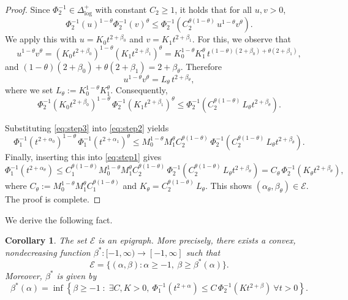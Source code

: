 \documentclass[12pt]{amsart}
\newtheorem{corollary}{Corollary}
\begin{document}
\begin{proof}
Since $\Phi_2^{-1}\in\Delta_{\log}^+$ with constant $C_2\ge 1$, it holds that for all $u,v>0$,
\[
\Phi_2^{-1}(u)^{1-\theta}\Phi_2^{-1}(v)^{\theta}
\le 
\Phi_2^{-1}\!\left(C_2^{\theta(1-\theta)}\,u^{1-\theta}v^{\theta}\right).
\]
We apply this with $u = K_0 t^{2+\beta_0}$ and $v = K_1 t^{2+\beta_1}$. For this, we observe that
\[
u^{1-\theta}v^{\theta}
= (K_0 t^{2+\beta_0})^{1-\theta} (K_1 t^{2+\beta_1})^{\theta}
= K_0^{1-\theta}K_1^{\theta} \,
t^{(1-\theta)(2+\beta_0)+\theta(2+\beta_1)},
\]
and $(1-\theta)(2+\beta_0)+\theta(2+\beta_1) = 2+\beta_\theta$. Therefore
\[
u^{1-\theta}v^{\theta} = L_\theta \, t^{2+\beta_\theta},
\]
where we set $L_\theta := K_0^{1-\theta}K_1^{\theta}$. Consequently,
\begin{equation}\label{eq:step3}
\Phi_2^{-1}(K_0 t^{2+\beta_0})^{1-\theta}\,
\Phi_2^{-1}(K_1 t^{2+\beta_1})^{\theta}
\le 
\Phi_2^{-1}\!\left(C_2^{\theta(1-\theta)}\,L_\theta t^{2+\beta_\theta}\right).
\end{equation}

Substituting \eqref{eq:step3} into \eqref{eq:step2} yields
\[
\Phi_1^{-1}(t^{2+\alpha_0})^{1-\theta}\,
\Phi_1^{-1}(t^{2+\alpha_1})^{\theta}
\le M_0^{1-\theta} M_1^{\theta} C_2^{\theta(1-\theta)}\,
\Phi_2^{-1}\!\left(C_2^{\theta(1-\theta)}\,L_\theta t^{2+\beta_\theta}\right).
\]
Finally, inserting this into \eqref{eq:step1} gives
\[
\Phi_1^{-1}(t^{2+\alpha_\theta})
\le C_1^{\theta(1-\theta)} M_0^{1-\theta} M_1^{\theta} C_2^{\theta(1-\theta)}\,
\Phi_2^{-1}\!\left(C_2^{\theta(1-\theta)}\,L_\theta t^{2+\beta_\theta}\right)
= C_\theta \, \Phi_2^{-1}\!\left(K_\theta t^{2+\beta_\theta}\right),
\]
where $C_\theta := M_0^{1-\theta} M_1^{\theta} C_1^{\theta(1-\theta)}$ and $K_\theta=C_2^{\theta(1-\theta)}\,L_\theta$. This shows $(\alpha_\theta,\beta_\theta) \in \mathcal{E}$. The proof is complete.
\end{proof}

We derive the following fact.
\begin{corollary}
The set $\mathcal{E}$ is an epigraph. More precisely, there exists a convex, nondecreasing function $\beta^*: [-1,\infty) \to [-1,\infty]$ such that
\[
\mathcal{E} = \{ (\alpha,\beta) : \alpha \ge -1,\ \beta \ge \beta^*(\alpha) \}.
\]
Moreover, $\beta^*$ is given by
\[
\beta^*(\alpha) = \inf\left\{ \beta \ge -1 \;:\; \exists C,K>0,\ 
\Phi_1^{-1}(t^{2+\alpha}) \le C\,\Phi_2^{-1}(Kt^{2+\beta}) \ \forall t>0 \right\}.
\]
\end{corollary}
\end{document}
